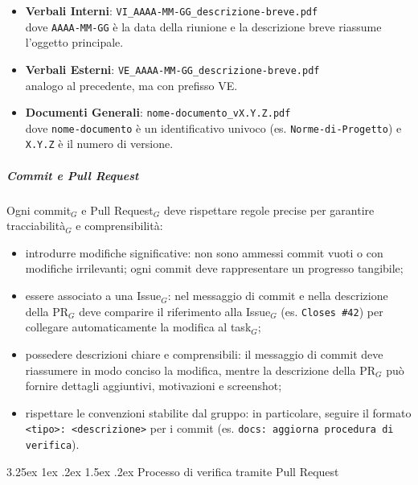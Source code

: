 \documentclass[a4paper, 10pt]{article}
\makeatletter
\renewcommand\paragraph{\@startsection{paragraph}{4}{\z@}%
  {3.25ex \@plus1ex \@minus .2ex}%
  {1.5ex \@plus .2ex}%
  {\normalfont\normalsize\bfseries}}
\makeatother
\begin{document}
\begin{itemize}
    \item \textbf{Verbali Interni}: \texttt{VI\_AAAA-MM-GG\_descrizione-breve.pdf}\\
    dove \texttt{AAAA-MM-GG} è la data della riunione e la descrizione breve riassume l'oggetto principale.
    \item \textbf{Verbali Esterni}: \texttt{VE\_AAAA-MM-GG\_descrizione-breve.pdf}\\
    analogo al precedente, ma con prefisso VE.
    \item \textbf{Documenti Generali}: \texttt{nome-documento\_vX.Y.Z.pdf}\\
    dove \texttt{nome-documento} è un identificativo univoco (es. \texttt{Norme-di-Progetto}) e \texttt{X.Y.Z} è il numero di versione.
\end{itemize}

\subparagraph{Commit e Pull Request}

Ogni commit$_G$ e Pull Request$_G$ deve rispettare regole precise per garantire tracciabilità$_G$ e comprensibilità:
\begin{itemize}
    \item introdurre modifiche significative: non sono ammessi commit vuoti o con modifiche irrilevanti; ogni commit deve rappresentare un progresso tangibile;
    \item essere associato a una Issue$_G$: nel messaggio di commit e nella descrizione della PR$_G$ deve comparire il riferimento alla Issue$_G$ (es. \texttt{Closes \#42}) per collegare automaticamente la modifica al task$_G$;
    \item possedere descrizioni chiare e comprensibili: il messaggio di commit deve riassumere in modo conciso la modifica, mentre la descrizione della PR$_G$ può fornire dettagli aggiuntivi, motivazioni e screenshot;
    \item rispettare le convenzioni stabilite dal gruppo: in particolare, seguire il formato \texttt{<tipo>: <descrizione>} per i commit (es. \texttt{docs: aggiorna procedura di verifica}).
\end{itemize}

\paragraph{Processo di verifica tramite Pull Request}
\end{document}
